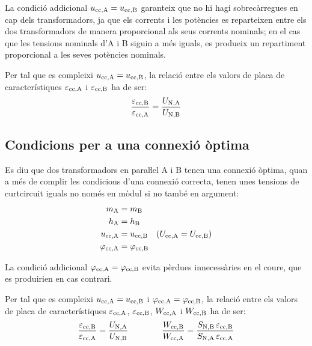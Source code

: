 La condició addicional  $u_\mathrm{cc,A} = u_\mathrm{cc,B}$ garanteix que no hi hagi sobrecàrregues en cap dels transformadors, ja que els corrents i les potències es reparteixen entre els dos transformadors de manera proporcional als seus corrents nominals; en el cas que les tensions nominals d'A i B siguin a més iguals, es produeix un repartiment proporcional a les seves potències nominals.

Per tal que es compleixi $u_\mathrm{cc,A} = u_\mathrm{cc,B}$, la relació entre els valors de placa de característiques $\varepsilon_\mathrm{cc,A}$ i $\varepsilon_\mathrm{cc,B}$ ha de ser:
\begin{equation}
    \frac{\varepsilon_\mathrm{cc,B}}{\varepsilon_\mathrm{cc,A}} = \frac{U_\mathrm{N,A}}{U_\mathrm{N,B}}
\end{equation}

\subsection{Condicions per a una connexió òptima}

 Es diu que dos transformadors en paraŀlel A i B tenen una connexió òptima, quan a més de complir les condicions d'una connexió correcta, tenen unes tensions de curtcircuit iguals no només en mòdul si no també en argument:
\begin{align}
    m_\mathrm{A} &= m_\mathrm{B}\\
    h_\mathrm{A} &= h_\mathrm{B}\\
    u_\mathrm{cc,A} &= u_\mathrm{cc,B} \quad (U_\mathrm{cc,A} = U_\mathrm{cc,B})\\
    \varphi_\mathrm{cc,A} &=\varphi_\mathrm{cc,B}
\end{align}

La condició addicional $\varphi_\mathrm{cc,A} =\varphi_\mathrm{cc,B}$ evita pèrdues innecessàries en el coure, que es produirien en cas contrari.

Per tal que es compleixi $u_\mathrm{cc,A} = u_\mathrm{cc,B} $ i $\varphi_\mathrm{cc,A} =\varphi_\mathrm{cc,B}$, la relació entre els valors de placa de característiques $\varepsilon_\mathrm{cc,A}$, $\varepsilon_\mathrm{cc,B}$, $W_\mathrm{cc,A}$ i $W_\mathrm{cc,B}$ ha de ser:
\begin{equation}
    \frac{\varepsilon_\mathrm{cc,B}}{\varepsilon_\mathrm{cc,A}} = \frac{U_\mathrm{N,A}}{U_\mathrm{N,B}} \qquad\qquad
    \frac{W_\mathrm{cc,B}}{W_\mathrm{cc,A}} = \frac{S_\mathrm{N,B} \,\varepsilon_\mathrm{cc,B}}{S_\mathrm{N,A}\, \varepsilon_\mathrm{cc,A}}
\end{equation}

